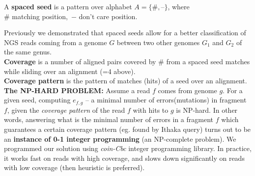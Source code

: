 \documentclass[portrait,final,a0paper,fontscale=0.277]{baposter}
\begin{document}
\begin{poster}
{  A {\bf spaced seed} is a pattern over alphabet 
  $A=\{\textbf{\#}, \textbf{--}\}$, where\\
  $\#$ matching position,\, $-$ don't care position.
\vspace{-0.5em}  
\vspace{-0.8em}

Previously\cite{sseed} we demonstrated that spaced seeds allow for a better
   classification of NGS reads coming from a genome $G$ between two
  other genomes $G_1$ and $G_2$ of the same genus.
\\  
 {\bf Coverage} is a number of aligned pairs covered 
 by $\textbf{\#}$ from a spaced seed matches while sliding over an alignment 
 (=4 above). 
 \\
{\bf Coverage pattern} is the pattern of matches (hits) of a seed over an alignment.
\\
{\bf The NP-HARD PROBLEM:}  Assume a read $f$ comes from genome $g$.
For a given seed, computing $e_{f,g}$ -- a minimal number of errors(mutations) in fragment $f$, given the {\em coverage pattern} of the read $f$ with hits to $g$ is NP-hard. In other words, answering what is the minimal number of errors in a fragment $f$ which guarantees a certain coverage pattern (eg. found by Ithaka query) turns out to be an {\bf instance of 0-1 integer programming} (an NP-complete problem). We programmed our solution using {\em coin-Cbc} integer programming library. In practice, it works fast on reads with high coverage, and slows down significantly on reads with low coverage (then heuristic is preferred).
   \vspace{0.15em}
  }


\end{poster}
\end{document}
